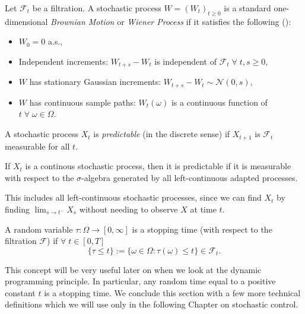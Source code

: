 \begin{definition}
    Let $\mathcal{F}_t$ be a filtration. A stochastic process $W=(W_t)_{t\geq0}$
    is a standard one-dimensional \emph{Brownian Motion} or \emph{Wiener Process}
    if it satisfies the following (\cite{BMSC}):
    \begin{itemize}
        \item $W_0=0$ a.s.,
        \item Independent increments: $W_{t+s}-W_t$ is independent of $\mathcal{F}_t\;\forall\;t,s\geq0$,
        \item $W$ has stationary Gaussian increments: $W_{t+s}-W_t\sim\mathcal{N}(0,s)$,
        \item $W$ has continuous sample paths: $W_t(\omega)$ is a continuous function of $t\;\forall\;\omega\in\Omega$.
    \end{itemize}
\end{definition}

\begin{definition}
    A stochastic process $X_t$ is \emph{predictable} (in the discrete sense) 
    if $X_{t+1}$ is $\mathcal{F}_{t}$ measurable for all $t$. 
    
    If $X_t$ is a continous stochastic process, then it is predictable if it is 
    measurable with respect to the $\sigma$-algebra generated by all left-continuous
    adapted processes. 
    
    This includes all left-continuous stochastic processes, 
    since we can find $X_t$ by finding $\lim_{s\rightarrow t^-}X_s$ without needing 
    to observe $X$ at time $t$.
\end{definition}

\begin{definition}
    A random variable $\tau:\Omega\rightarrow[0,\infty]$ is a stopping time (with
    respect to the filtration $\mathcal{F}$) if $\forall\;t\in[0,T]$
    \begin{equation*}
        \{\tau\leq t\}:=\{\omega\in\Omega:\tau(\omega)\leq t\}\in\mathcal{F}_t.
    \end{equation*}
\end{definition}

This concept will be very useful later on when we look at the dynamic programming 
principle. In particular, any random time equal to a positive constant $t$ is a 
stopping time. We conclude this section with a few more technical definitions which 
we will use only in the following Chapter on stochastic control.

